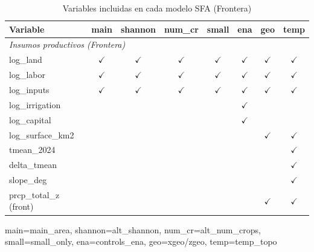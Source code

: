 \documentclass[11pt,a4paper]{article}
\begin{document}
\begin{table}[H]
\centering
\caption{Variables incluidas en cada modelo SFA (Frontera)}
\label{tab:sfa_spec_frontier}
\begin{threeparttable}
\footnotesize
\begin{tabular}{p{3.5cm}ccccccc}
\toprule
\textbf{Variable} & \textbf{main} & \textbf{shannon} & \textbf{num\_cr} & \textbf{small} & \textbf{ena} & \textbf{geo} & \textbf{temp} \\
\midrule
\multicolumn{8}{l}{\textit{Insumos productivos (Frontera)}} \\
log\_land & $\checkmark$ & $\checkmark$ & $\checkmark$ & $\checkmark$ & $\checkmark$ & $\checkmark$ & $\checkmark$ \\
log\_labor & $\checkmark$ & $\checkmark$ & $\checkmark$ & $\checkmark$ & $\checkmark$ & $\checkmark$ & $\checkmark$ \\
log\_inputs & $\checkmark$ & $\checkmark$ & $\checkmark$ & $\checkmark$ & $\checkmark$ & $\checkmark$ & $\checkmark$ \\
log\_irrigation & & & & & $\checkmark$ & & \\
log\_capital & & & & & $\checkmark$ & & \\
log\_surface\_km2 & & & & & & $\checkmark$ & $\checkmark$ \\
tmean\_2024 & & & & & & & $\checkmark$ \\
delta\_tmean & & & & & & & $\checkmark$ \\
slope\_deg & & & & & & & $\checkmark$ \\
prcp\_total\_z (front) & & & & & & $\checkmark$ & $\checkmark$ \\
\bottomrule
\end{tabular}
\begin{tablenotes}
\footnotesize
\item main=main\_area, shannon=alt\_shannon, num\_cr=alt\_num\_crops, small=small\_only, ena=controls\_ena, geo=xgeo/zgeo, temp=temp\_topo
\end{tablenotes}
\end{threeparttable}
\end{table}
\end{document}
